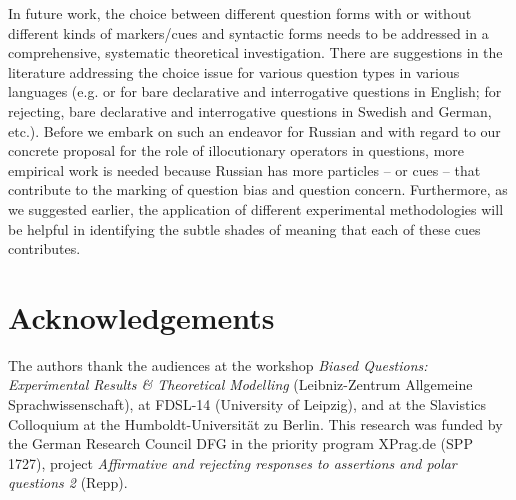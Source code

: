 \documentclass[output=paper,colorlinks,citecolor=brown]{langscibook}
\begin{document}
In future work, the choice between different question forms with or without different kinds of markers/cues and syntactic forms needs to be addressed in a comprehensive, systematic theoretical investigation. There are suggestions in the literature addressing the choice issue for various question types in various languages (e.g. \citealt{gunlogson08} or \citealt{Trinh2014} for bare declarative and interrogative questions in English; \citealt{Seeliger2019Swedish} for rejecting, bare declarative and interrogative questions in Swedish and German, etc.). Before we embark on such an endeavor for Russian and with regard to our concrete proposal for the role of illocutionary operators in questions, more empirical work is needed because Russian has more particles – or cues – that contribute to the marking of question bias and question concern. Furthermore, as we suggested earlier, the application of different experimental methodologies will be helpful in identifying the subtle shades of meaning that each of these cues contributes. 

\section{Acknowledgements}

The authors thank the audiences at the workshop \textit{Biased Questions: Experimental Results \& Theoretical Modelling} (Leibniz-Zentrum Allgemeine Sprach\-wissen\-schaft), at FDSL-14 (University of Leipzig), and at the Slavistics Colloquium at the Hum\-boldt-Universität zu Berlin. This research was funded by the German Research Council DFG in the priority program XPrag.de (SPP 1727), project \textit{Affirmative and rejecting responses to assertions and polar questions 2} (Repp).

{\sloppy\printbibliography[heading=subbibliography,notkeyword=this]}
\end{document}

